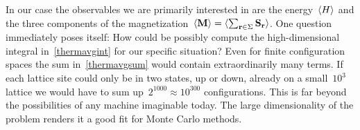 In our case the observables we are primarily interested in are the
energy~$\langle H \rangle$ and the three components of the magnetization~$\langle \mathbf{M} \rangle =
\langle \sum_{\mathbf{r} \in \Sigma} \mathbf{S}_{\mathbf{r}} \rangle$. One question immediately poses itself: How
could be possibly compute the high-dimensional integral in~\eqref{thermavgint}
for our specific situation? Even for finite configuration spaces the sum
in~\eqref{thermavgsum} would contain extraordinarily many terms. If each lattice
site could only be in two states, up or down, already on a small~$10^3$ lattice
we would have to sum up~$2^{1000} \approx 10^{300}$ configurations. This is far
beyond the possibilities of any machine imaginable today. The large
dimensionality of the problem renders it a good fit for Monte Carlo methods.
